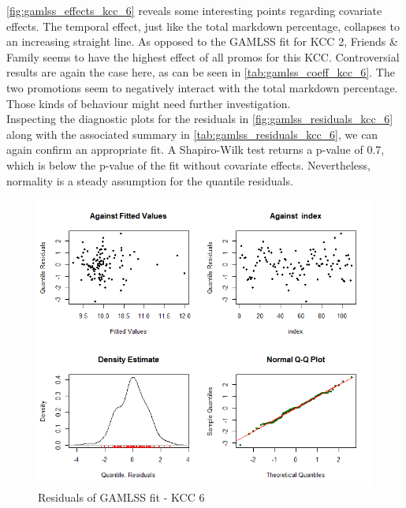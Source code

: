 \autoref{fig:gamlss_effects_kcc_6} reveals some interesting points regarding covariate effects. The temporal effect, just like the total markdown percentage, collapses to an increasing straight line. 
As opposed to the \ac{GAMLSS} fit for \ac{KCC} 2, Friends \& Family seems to have the highest effect of all promos for this \ac{KCC}. Controversial results are again the case here, as can be seen in \autoref{tab:gamlss_coeff_kcc_6}. The two promotions seem to negatively interact with the total markdown percentage. Those kinds of behaviour might need further investigation.
\\


Inspecting the diagnostic plots for the residuals in \autoref{fig:gamlss_residuals_kcc_6} along with the associated summary in \autoref{tab:gamlss_residuals_kcc_6}, we can again confirm an appropriate fit. A Shapiro-Wilk test returns a p-value of 0.7, which is below the p-value of the fit without covariate effects. Nevertheless, normality is a steady assumption for the quantile residuals.
\\




\begin{figure}[H]
\centering
  \includegraphics[width=0.95\linewidth]{figures/gamlss_residuals_kcc_6.png}
  \caption{Residuals of GAMLSS fit - KCC 6}
  \label{fig:gamlss_residuals_kcc_6}
\end{figure}


